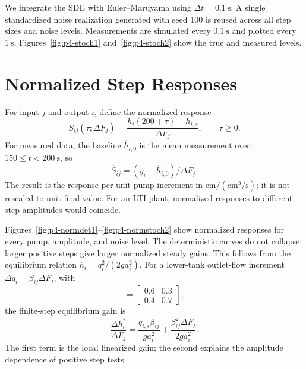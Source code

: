 We integrate the SDE with Euler--Maruyama using $\Delta t=0.1\ \mathrm{s}$. A single standardized noise realization generated with seed 100 is reused across all step sizes and noise levels. Measurements are simulated every $0.1\ \mathrm{s}$ and plotted every $1\ \mathrm{s}$. Figures~\ref{fig:p4-stoch1} and~\ref{fig:p4-stoch2} show the true and measured levels.

\section{Normalized Step Responses}

For input \(j\) and output \(i\), define the normalized response
\begin{equation}
 S_{ij}(\tau;\Delta F_j)=
 \frac{h_i(200+\tau)-h_{i,s}}{\Delta F_j},\qquad \tau\geq0.
 \label{eq:p4-normalization}
\end{equation}
For measured data, the baseline \(\widehat h_{i,0}\) is the mean measurement over \(150\leq t<200\ \mathrm{s}\), so
\[
\widehat S_{ij}=(y_i-\widehat h_{i,0})/\Delta F_j.
\]
The result is the response per unit pump increment in
\(\mathrm{cm/(cm^3/s)}\); it is not rescaled to unit final value. For an LTI
plant, normalized responses to different step amplitudes would coincide.

Figures~\ref{fig:p4-normdet1}--\ref{fig:p4-normstoch2} show normalized responses for every pump, amplitude, and noise level. The deterministic curves do not collapse: larger positive steps give larger normalized steady gains. This follows from the equilibrium relation \(h_i=q_i^2/(2ga_i^2)\). For a lower-tank outlet-flow increment \(\Delta q_i=\beta_{ij}\Delta F_j\), with
\begin{equation}
 [\beta_{ij}]=\begin{bmatrix}0.6&0.3\\0.4&0.7\end{bmatrix},
\end{equation}
the finite-step equilibrium gain is
\begin{equation}
 \frac{\Delta h_i^*}{\Delta F_j}
 =\frac{q_{i,s}\beta_{ij}}{ga_i^2}
  +\frac{\beta_{ij}^2\Delta F_j}{2ga_i^2}.
 \label{eq:p4-secant}
\end{equation}
The first term is the local linearized gain; the second explains the amplitude dependence of positive step tests.

